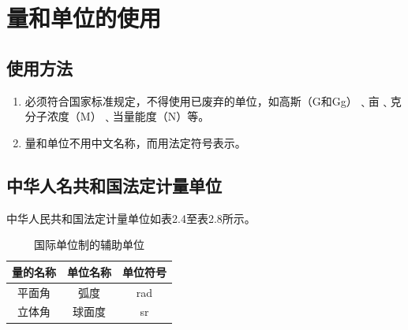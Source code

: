 \section{量和单位的使用}
\subsection{使用方法}
\begin{enumerate}
\item 必须符合国家标准规定，不得使用已废弃的单位，如高斯（G和Gg）﹑亩﹑克分子浓度（M）﹑当量能度（N）等。
\item 量和单位不用中文名称，而用法定符号表示。
\end{enumerate}

\subsection{中华人名共和国法定计量单位}
中华人民共和国法定计量单位如表2.4至表2.8所示。
\begin{table}
	\centering
	\song\wuhao
	\caption{国际单位制的辅助单位}
	\begin{tabular}{ccc}
	\hline
	量的名称&单位名称&单位符号\\
	\hline
	平面角&弧度&rad\\
	立体角&球面度&sr\\
	\hline
	\end{tabular}
\end{table}

